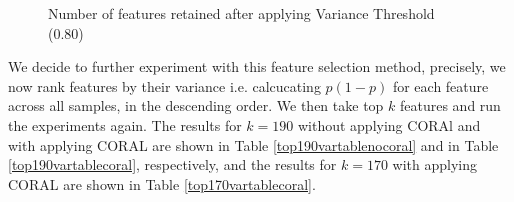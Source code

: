 \begin{figure}[ht]
\centering
\caption{Number of features retained after applying Variance Threshold (0.80)}
\label{featuresretained80figure}
\end{figure}

We decide to further experiment with this feature selection method, precisely, we now rank features by their variance i.e. calcucating $p(1-p)$ for each feature across all samples, in the descending order. We then take top $k$ features and run the experiments again. The results for $k = 190$ without applying CORAl and with applying CORAL are shown in Table \ref{top190vartablenocoral} and in Table \ref{top190vartablecoral}, respectively, and the results for $k = 170$ with applying CORAL are shown in Table \ref{top170vartablecoral}.

